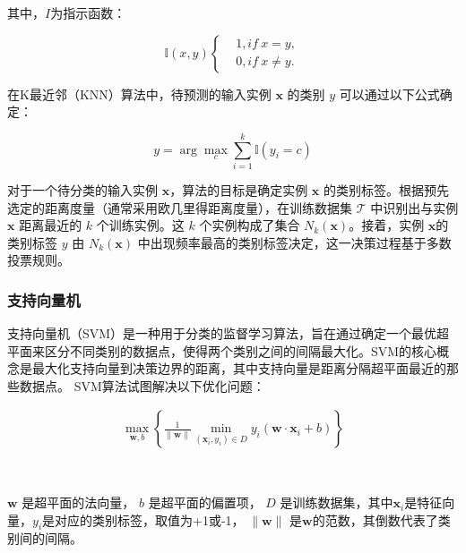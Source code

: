 \documentclass[a4paper, 10pt]{article}
\begin{document}
	其中，$I$为指示函数：
	
	\begin{equation}
		\mathbb{I} \left( x,y\right)
		\left\{
		\begin{aligned}
			&1, if \ x=y ,\\
			&0, if \ x\neq y.
		\end{aligned}
		\right.
	\end{equation}
	
	在K最近邻（KNN）算法中，待预测的输入实例 $\mathbf{x}$ 的类别 $y$ 可以通过以下公式确定：
	
	\begin{equation}
		y = \arg\max_{c} \sum_{i=1}^{k} \mathbb{I} (y_i = c)
	\end{equation}
	
	对于一个待分类的输入实例 $\mathbf{x}$，算法的目标是确定实例 $\mathbf{x}$ 的类别标签。根据预先选定的距离度量（通常采用欧几里得距离度量），在训练数据集 $\mathcal{T}$ 中识别出与实例 $\mathbf{x}$ 距离最近的 $k$ 个训练实例。这 $k$ 个实例构成了集合 $N_k(\mathbf{x}) $。接着，实例 $\mathbf{x} $的类别标签 $y$ 由 $N_k(\mathbf{x})$ 中出现频率最高的类别标签决定，这一决策过程基于多数投票规则。
	
	
	\subsubsection{支持向量机}
	
	支持向量机（SVM）是一种用于分类的监督学习算法，旨在通过确定一个最优超平面来区分不同类别的数据点，使得两个类别之间的间隔最大化。SVM的核心概念是最大化支持向量到决策边界的距离，其中支持向量是距离分隔超平面最近的那些数据点。
	SVM算法试图解决以下优化问题：
	
	\begin{equation}
		\begin{aligned}
			\max_{\mathbf{w}, b} \left\{ \frac{1}{\|\mathbf{w}\|} \min_{(\mathbf{x}_i, y_i) \in D} y_i(\mathbf{w} \cdot \mathbf{x}_i + b) \right\}
		\end{aligned}
		\label{eq: svm}
	\end{equation}
	
	$ $
	
	\( \mathbf{w} \) 是超平面的法向量， \( b \) 是超平面的偏置项， \( D \) 是训练数据集，其中\( \mathbf{x}_i \)是特征向量，\( y_i \)是对应的类别标签，取值为+1或-1， \( \|\mathbf{w}\| \) 是\( \mathbf{w} \)的范数，其倒数代表了类别间的间隔。
	
	
		
\end{document}
